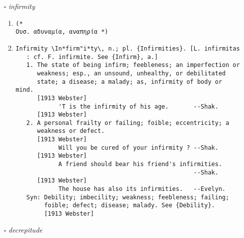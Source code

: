 \documentclass{article}
\begin{document}
\begin{itemize}
\begin{enumerate}
\item{
\begin{lstlisting}
(* 
Ουσ. αδύνατο σημείο, αδυναμία *)
\end{lstlisting}}
\item{
\begin{lstlisting}
Foible \Foi"ble\, a. [OF. foible. See {Feeble}.]
   Weak; feeble. [Obs.] --Lord Herbert.
   [1913 Webster]
Foible \Foi"ble\, n.
   1. A moral weakness; a failing; a weak point; a frailty.
      [1913 Webster]
            A disposition radically noble and generous, clouded
            and overshadowed by superficial foibles. --De
                                                  Quincey.
      [1913 Webster]
   2. The half of a sword blade or foil blade nearest the point;
      -- opposed to {forte}. [Written also {faible}.]
   Syn: Fault; imperfection; failing; weakness; infirmity;
        frailty; defect. See {Fault}.
        [1913 Webster]
\end{lstlisting}}
\end{enumerate}
\item[$\square$] \emph{ infirmity }
\begin{enumerate}
\item{
\begin{lstlisting}
(* 
Ουσ. αδυναμία, αναπηρία *)
\end{lstlisting}}
\item{
\begin{lstlisting}
Infirmity \In*firm"i*ty\, n.; pl. {Infirmities}. [L. infirmitas
   : cf. F. infirmite. See {Infirm}, a.]
   1. The state of being infirm; feebleness; an imperfection or
      weakness; esp., an unsound, unhealthy, or debilitated
      state; a disease; a malady; as, infirmity of body or mind.
      [1913 Webster]
            'T is the infirmity of his age.       --Shak.
      [1913 Webster]
   2. A personal frailty or failing; foible; eccentricity; a
      weakness or defect.
      [1913 Webster]
            Will you be cured of your infirmity ? --Shak.
      [1913 Webster]
            A friend should bear his friend's infirmities.
                                                  --Shak.
      [1913 Webster]
            The house has also its infirmities.   --Evelyn.
   Syn: Debility; imbecility; weakness; feebleness; failing;
        foible; defect; disease; malady. See {Debility}.
        [1913 Webster]
\end{lstlisting}}
\end{enumerate}
\item[$\square$] \emph{ decrepitude }

\end{itemize}
\end{document}
